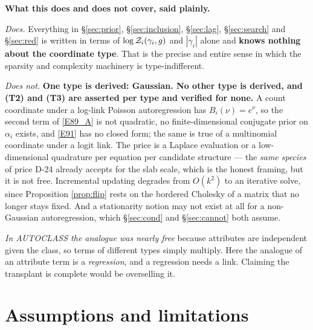 \begin{recordbox}
\textbf{What this does and does not cover, said plainly.}

\emph{Does.} Everything in \S\ref{sec:prior}, \S\ref{sec:inclusion},
\S\ref{sec:lag}, \S\ref{sec:search} and \S\ref{sec:red} is written in terms of
$\log\mathcal{Z}_i(\gamma_i,g)$ and $|\gamma_i|$ alone and \textbf{knows nothing about the
coordinate type}. That is the precise and entire sense in which the sparsity and
complexity machinery is type-indifferent.

\emph{Does not.} \textbf{One type is derived: Gaussian. No other type is derived, and
(T2) and (T3) are asserted per type and verified for none.} A count coordinate under
a log-link Poisson autoregression has $B_i(\nu)=e^\nu$, so the second term of
\eqref{E89_A} is not quadratic, no finite-dimensional conjugate prior on $\alpha_i$
exists, and \eqref{E91} has no closed form; the same is true of a multinomial
coordinate under a logit link. The price is a Laplace evaluation or a
low-dimensional quadrature per equation per candidate structure --- the \emph{same
species} of price D-24 already accepts for the slab scale, which is the honest
framing, but it is not free. Incremental updating degrades from $O(k^2)$ to an
iterative solve, since Proposition \ref{prop:flip} rests on the bordered Cholesky of
a matrix that no longer stays fixed. And a stationarity notion may not exist at all
for a non-Gaussian autoregression, which \S\ref{sec:cond} and \S\ref{sec:cannot}
both assume.

\emph{In AUTOCLASS the analogue was nearly free} because attributes are independent
given the class, so terms of different types simply multiply. Here the analogue of an
attribute term is a \emph{regression}, and a regression needs a link. Claiming the
transplant is complete would be overselling it.
\end{recordbox}


\section{Assumptions and limitations}\label{sec:assump}

